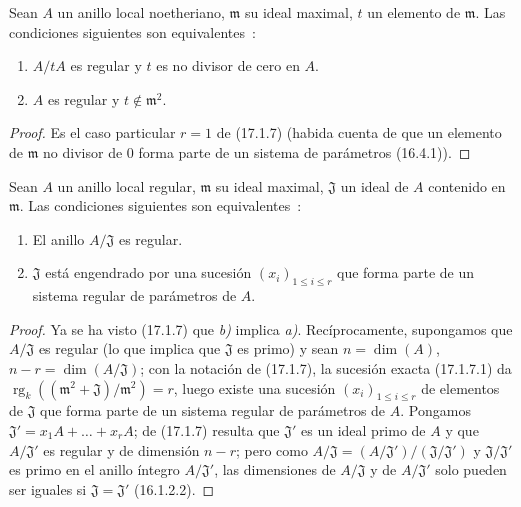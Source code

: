 
\begin{corollary}[17.1.8]
\label{0.17.1.8-fr}
Sean $A$ un anillo local noetheriano, $\mathfrak{m}$ su ideal maximal, $t$ un
elemento de $\mathfrak{m}$. Las condiciones siguientes son equivalentes~:
\begin{enumerate}
  \item[\rm a)] $A/tA$ es regular y $t$ es no divisor de cero en $A$.
  \item[\rm b)] $A$ es regular y $t\notin\mathfrak{m}^2$.
\end{enumerate}
\end{corollary}

\begin{proof}
Es el caso particular $r=1$ de (17.1.7) (habida cuenta de que un elemento de
$\mathfrak{m}$ no divisor de $0$ forma parte de un sistema de parámetros
(16.4.1)).
\end{proof}

\begin{corollary}[17.1.9]
\label{0.17.1.9-fr}
Sean $A$ un anillo local regular, $\mathfrak{m}$ su ideal maximal,
$\mathfrak{J}$ un ideal de $A$ contenido en $\mathfrak{m}$. Las condiciones
siguientes son equivalentes~:
\begin{enumerate}
  \item[\rm a)] El anillo $A/\mathfrak{J}$ es regular.
  \item[\rm b)] $\mathfrak{J}$ está engendrado por una sucesión
  $(x_i)_{1\leq i\leq r}$ que forma parte de un sistema regular de parámetros
  de $A$.
\end{enumerate}
\end{corollary}

\begin{proof}
Ya se ha visto (17.1.7) que \emph{b)} implica \emph{a)}. Recíprocamente, supongamos que
$A/\mathfrak{J}$ es regular (lo que implica que $\mathfrak{J}$ es primo)
y sean $n=\dim(A)$, $n-r=\dim(A/\mathfrak{J})$; con la notación de
(17.1.7), la sucesión exacta (17.1.7.1) da
$\operatorname{rg}_k((\mathfrak{m}^2+\mathfrak{J})/\mathfrak{m}^2)=r$, luego
existe una sucesión $(x_i)_{1\leq i\leq r}$ de elementos de $\mathfrak{J}$ que
forma parte de un sistema regular de parámetros de $A$. Pongamos
$\mathfrak{J}'=x_1A+\ldots+x_rA$; de (17.1.7) resulta que $\mathfrak{J}'$
es un ideal primo de $A$ y que $A/\mathfrak{J}'$ es regular y de
dimensión $n-r$; pero como
$A/\mathfrak{J}=(A/\mathfrak{J}')/(\mathfrak{J}/\mathfrak{J}')$ y
$\mathfrak{J}/\mathfrak{J}'$ es primo en el anillo íntegro
$A/\mathfrak{J}'$, las dimensiones de $A/\mathfrak{J}$ y de
$A/\mathfrak{J}'$ solo pueden ser iguales si
$\mathfrak{J}=\mathfrak{J}'$ (16.1.2.2).
\end{proof}

